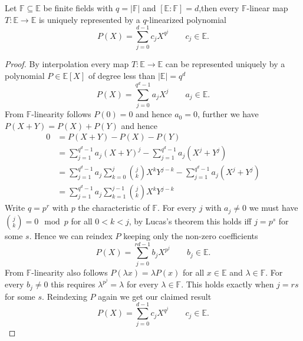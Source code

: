 \documentclass[11pt,letterpaper,usenames,dvipsnames]{article}
\begin{document}
\begin{theorem}
Let $\mathbb{F} \subseteq \mathbb{E}$ be finite fields with $q = |\mathbb{F}|$ and $[\mathbb{E}:\mathbb{F}] = d$,then every $\mathbb{F}$-linear map $T: \mathbb{E} \to \mathbb{E}$ is uniquely represented by a $q$-linearized polynomial
\[
P(X)=\sum_{j=0}^{d - 1} c_j X^{q^j} \qquad c_j\in\mathbb E \text{.}
\]
\end{theorem}
\begin{proof}
By interpolation every map $T: \mathbb{E} \to \mathbb{E}$ can be represented uniquely by a polynomial $P \in \mathbb{E}[X]$ of degree less than $|\mathbb{E}| = q^d$
\[
P(X)=\sum_{j=0}^{q^d - 1} a_j X^j \qquad a_j\in\mathbb E \text{.}
\]
From $\mathbb{F}$-linearity follows $P(0) = 0$ and hence $a_0 = 0$, further we have $P(X + Y) = P(X) + P(Y)$ and hence
\[
\begin{aligned}
0 &= P(X + Y) - P(X) - P(Y) \\
&= \sum_{j=1}^{q^d - 1} a_j (X + Y)^j - \sum_{j=1}^{q^d - 1} a_j (X^j + Y^j) \\
&= \sum_{j=1}^{q^d - 1} a_j \sum_{k=0}^{j} \binom{j}{k}X^k Y^{j-k} - \sum_{j=1}^{q^d - 1} a_j (X^j + Y^j)\\
&= \sum_{j=1}^{q^d - 1} a_j \sum_{k=1}^{j-1} \binom{j}{k}X^k Y^{j-k}
\end{aligned}
\]
Write $q=p^r$ with $p$ the characteristic of $\mathbb{F}$. For every $j$ with $a_j \neq 0$ we must have $\binom{j}{k} =0 \mod p$ for all $0<k<j$, by Lucas’s theorem this holds iff $j = p^s$ for some $s$. Hence we can reindex $P$ keeping only the non-zero coefficients
\[
P(X)=\sum_{j=0}^{rd - 1} b_j X^{p^j} \qquad b_j\in\mathbb E \text{.}
\]
From $\mathbb{F}$-linearity also follows $P(\lambda x) = \lambda P(x)$ for all $x \in \mathbb{E}$ and $\lambda \in \mathbb{F}$. For every $b_j \neq 0$ this requires $\lambda^{p^j} = \lambda$ for every $\lambda \in \mathbb{F}$. This holds exactly when $j = r s$ for some $s$. Reindexing $P$ again we get our claimed result
\[
P(X)=\sum_{j=0}^{d - 1} c_j X^{q^j} \qquad c_j\in\mathbb E \text{.}
\]
\end{proof}
\end{document}
